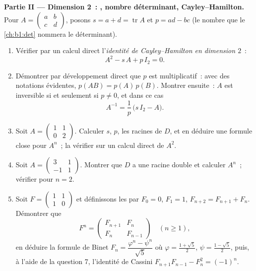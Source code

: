 \begin{problem}
\medskip
\noindent\textbf{Partie II --- Dimension 2~: , nombre
déterminant, Cayley--Hamilton.} Pour $A = \begin{pmatrix} a & b\\ c &
d\end{pmatrix}$, posons $s = a + d = \operatorname{tr} A$ et $p = ad
- bc$ (le nombre que le \cref{ch:b1:det} nommera le
déterminant).
\begin{enumerate}[resume]
  \item Vérifier par un calcul direct l'\emph{identité de
        Cayley--Hamilton en dimension $2$}~:
        \[
        A^2 - s\,A + p\,I_2 = 0 .
        \]
  \item Démontrer par développement direct que $p$ est multiplicatif~:
        avec des notations évidentes, $p(AB) = p(A)\,p(B)$. Montrer
        ensuite~: $A$ est inversible si et seulement si $p \neq 0$, et
        dans ce cas
        \[
        A^{-1} = \frac1p\,\bigl(s\,I_2 - A\bigr).
        \]
  \item Soit $A = \begin{pmatrix} 1 & 1\\ 0 & 2\end{pmatrix}$.
        Calculer $s$, $p$, les racines de $D$, et en déduire une
        formule close pour $A^n$~; la vérifier sur un calcul direct
        de $A^2$.
  \item Soit $A = \begin{pmatrix} 3 & 1\\ -1 & 1\end{pmatrix}$.
        Montrer que $D$ a une racine double et calculer $A^n$~;
        vérifier pour $n = 2$.
  \item Soit $F = \begin{pmatrix} 1 & 1\\ 1 & 0\end{pmatrix}$ et
        définissons les  par $F_0 = 0$, $F_1 = 1$,
        $F_{n+2} = F_{n+1} + F_n$. Démontrer que
        \[
        F^n = \begin{pmatrix} F_{n+1} & F_n\\ F_n &
        F_{n-1}\end{pmatrix} \quad (n \geq 1),
        \]
        en déduire la formule de Binet $F_n = \dfrac{\varphi^n -
        \psi^n}{\sqrt5}$ où $\varphi = \frac{1 + \sqrt5}2$,
        $\psi = \frac{1 - \sqrt5}2$, puis, à l'aide de la question 7,
        l'identité de Cassini $F_{n+1}F_{n-1} - F_n^2 = (-1)^n$.
\end{enumerate}


\end{problem}

